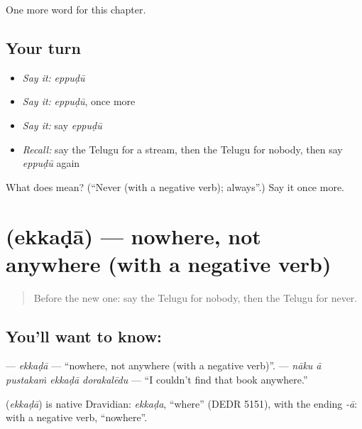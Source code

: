 \begin{grammarlens}[title={What you've built}]
One more word for this chapter.
\end{grammarlens}

\subsection*{Your turn}
\begin{itemize}
\raggedright
  \item \emph{Say it:} \emph{eppuḍū}
  \item \emph{Say it:} \emph{eppuḍū}, once more
  \item \emph{Say it:} say \emph{eppuḍū}
  \item \emph{Recall:} say the Telugu for a stream, then the Telugu for nobody, then say \emph{eppuḍū} again
\end{itemize}

\begin{tcolorbox}[breakable,colback=teal!4,colframe=teal!35!black,title={Before you move on}]
What does  mean? (\textquotedblleft{}Never (with a negative verb); always\textquotedblright{}.) Say it once more.
\end{tcolorbox}
\section[\texorpdfstring{\te{ఎక్కడా} (ekkaḍā)}{ఎక్కడా (ekkaḍā)}]{ (ekkaḍā) — nowhere, not anywhere (with a negative verb)}

\label{lesson:TE-C153-ekkada}



\begin{quote}
Before the new one: say the Telugu for nobody, then the Telugu for never.
\end{quote}

\subsection*{You'll want to know: }
\textbf{} — \emph{ekkaḍā} — \textquotedblleft{}nowhere, not anywhere (with a negative verb)\textquotedblright{}. \textbf{    } — \emph{nāku ā pustakaṁ ekkaḍā dorakalēdu} — \textquotedblleft{}I couldn't find that book anywhere.\textquotedblright{}

\begin{cousinweb}
\textbf{} (\emph{ekkaḍā}) is native Dravidian: \emph{ekkaḍa}, \textquotedblleft{}where\textquotedblright{} (DEDR 5151), with the ending \emph{-ā}: with a negative verb, \textquotedblleft{}nowhere\textquotedblright{}.
\end{cousinweb}

